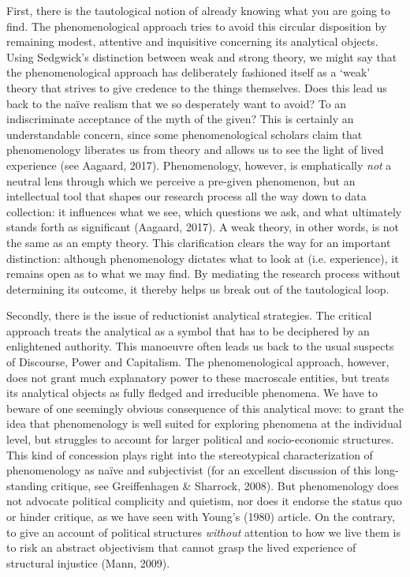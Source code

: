 \begin{adjmulticols}{2}{0mm}{0mm}
First, there is the tautological notion of already knowing what you are going to find. The phenomenological approach tries to avoid this circular disposition by remaining modest, attentive and inquisitive concerning its analytical objects. Using Sedgwick’s distinction between weak and strong theory, we might say that the phenomenological approach has deliberately fashioned itself as a ‘weak’ theory that strives to give credence to the things themselves. Does this lead us back to the naïve realism that we so desperately want to avoid? To an indiscriminate acceptance of the myth of the given? This is certainly an understandable concern, since some phenomenological scholars claim that phenomenology liberates us from theory and allows us to see the light of lived experience (see Aagaard, 2017). Phenomenology, however, is emphatically \textit{not} a neutral lens through which we perceive a pre-given phenomenon, but an intellectual tool that shapes our research process all the way down to data collection: it influences what we see, which questions we ask, and what ultimately stands forth as significant (Aagaard, 2017). A weak theory, in other words, is not the same as an empty theory. This clarification clears the way for an important distinction: although phenomenology dictates what to look at (i.e. experience), it remains open as to what we may find. By mediating the research process without determining its outcome, it thereby helps us break out of the tautological loop.

Secondly, there is the issue of reductionist analytical strategies. The critical approach treats the analytical as a symbol that has to be deciphered by an enlightened authority. This manoeuvre often leads us back to the usual suspects of Discourse, Power and Capitalism. The phenomenological approach, however, does not grant much explanatory power to these macroscale entities, but treats its analytical objects as fully fledged and irreducible phenomena. We have to beware of one seemingly obvious consequence of this analytical move: to grant the idea that phenomenology is well suited for exploring phenomena at the individual level, but struggles to account for larger political and socio-economic structures. This kind of concession plays right into the stereotypical characterization of phenomenology as naïve and subjectivist (for an excellent discussion of this long-standing critique, see Greiffenhagen \& Sharrock, 2008). But phenomenology does not advocate political complicity and quietism, nor does it endorse the status quo or hinder critique, as we have seen with Young’s (1980) article. On the contrary, to give an account of political structures \textit{without} attention to how we live them is to risk an abstract objectivism that cannot grasp the lived experience of structural injustice (Mann, 2009).


\end{adjmulticols}
